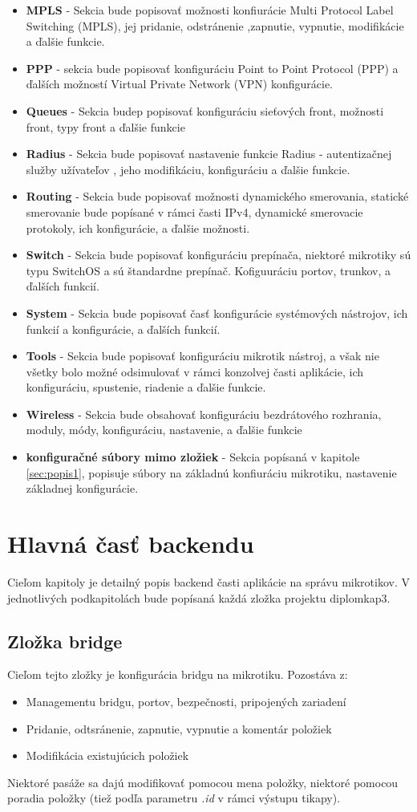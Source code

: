 \begin{itemize}
\item \textbf{MPLS} - Sekcia bude popisovať možnosti konfiurácie Multi Protocol Label Switching (MPLS), jej pridanie, odstránenie ,zapnutie, vypnutie, modifikácie a ďalšie funkcie.
\item \textbf{PPP} - sekcia bude popisovať konfiguráciu Point to Point Protocol (PPP) a ďalších možností Virtual Private Network (VPN) konfigurácie.
\item \textbf{Queues} - Sekcia budep popisovať konfiguráciu sieťových front, možnosti front, typy front a ďalšie funkcie
\item \textbf{Radius} - Sekcia bude popisovať nastavenie funkcie Radius - autentizačnej služby užívateľov , jeho modifikáciu, konfiguráciu a ďalšie funkcie.
\item \textbf{Routing} - Sekcia bude popisovať možnosti dynamického smerovania, statické smerovanie bude popísané v rámci časti IPv4, dynamické smerovacie protokoly, ich konfigurácie, a ďalšie možnosti. 
\item \textbf{Switch} - Sekcia bude popisovať konfiguráciu prepínača, niektoré mikrotiky sú typu SwitchOS a sú štandardne prepínač. Kofiguuráciu portov, trunkov, a ďalších funkcií. 
\item \textbf{System} - Sekcia bude popisovať časť konfigurácie systémových nástrojov, ich funkcií a konfigurácie, a ďalších funkcií.
\item \textbf{Tools} - Sekcia bude popisovať konfiguráciu mikrotik nástroj, a však nie všetky bolo možné odsimulovať v rámci konzolvej časti aplikácie, ich konfiguráciu, spustenie, riadenie a ďalšie funkcie. 
\item \textbf{Wireless} - Sekcia bude obsahovať konfiguráciu bezdrátového rozhrania, moduly, módy, konfiguráciu, nastavenie, a ďalšie funkcie
\item \textbf{konfiguračné súbory mimo zložiek} - Sekcia popísaná v kapitole  \ref{sec:popis1}, popisuje súbory na základnú konfiuráciu mikrotiku, nastavenie základnej konfigurácie.
\end{itemize}
\chapter{Hlavná časť backendu}
Cieľom kapitoly je detailný popis backend časti aplikácie na správu mikrotikov. V jednotlivých podkapitolách bude popísaná každá zložka projektu diplomkap3.
\section{Zložka bridge}
Cieľom tejto zložky je konfigurácia bridgu na mikrotiku. Pozostáva z:\begin{itemize}
\item Managementu bridgu, portov, bezpečnosti, pripojených zariadení
\item Pridanie, odtsránenie, zapnutie, vypnutie a komentár položiek
\item Modifikácia existujúcich položiek
\end{itemize} 
Niektoré pasáže sa dajú modifikovať pomocou mena položky, niektoré pomocou poradia položky (tiež podľa parametru \textit{.id} v rámci výstupu tikapy).
